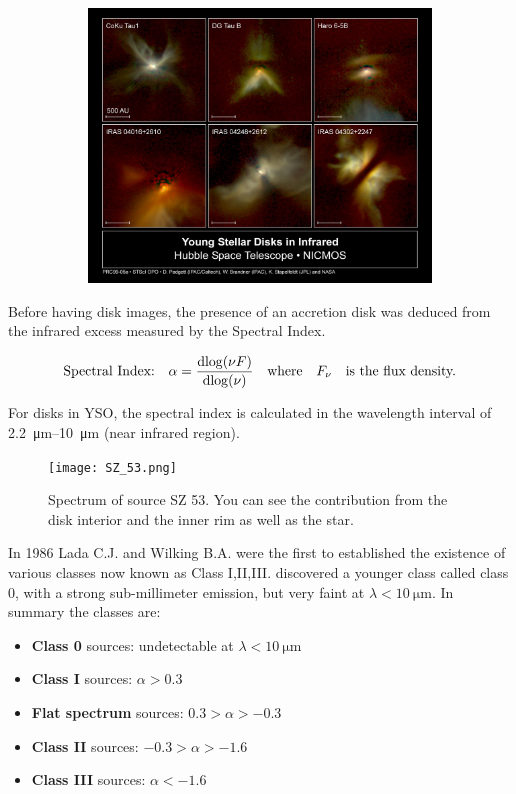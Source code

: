 \documentclass[10pt,a4paper,english]{article}
\begin{document}
\begin{figure}[!ht]
\begin{subfigure}[t]{0.595\textwidth}
    \includegraphics[width=\textwidth]{YSO_IR.jpg}
  \end{subfigure}
\end{figure}

Before having disk images, the presence of an accretion disk was deduced from
the infrared excess measured by the Spectral Index.

\[
    \text{Spectral Index:}\quad \alpha=\frac{\mathrm{d}{\log(\nu F)}}{\mathrm{d}{
    \log(\nu)}}\quad\text{where}\quad F_{\nu}\quad\text{is the flux density.}
\]


For disks in YSO, the spectral index is calculated in the wavelength interval
of \SIrange{2.2}{10}{\um} (near infrared region).

\begin{figure}[!ht]
  \centering
  \texttt{[image: SZ\_53.png]}
  \caption{\label{fig:SZ_53} Spectrum of source SZ 53. You can see the contribution from the disk interior and the inner rim as well as the star.}
\end{figure}

In 1986 Lada C.J. and Wilking B.A. were the first to established the existence
of various classes now known as Class I,II,III. \cite{1993ApJ...406..122A}
discovered a younger class called class 0, with a strong sub-millimeter
emission, but very faint at $\lambda<\SI{10}{\um}$. In summary the classes are:
\begin{itemize}
    \item \textbf{Class 0} sources: undetectable at $\lambda<\SI{10}{\um}$
    \item \textbf{Class I} sources: $\alpha>0.3$
    \item \textbf{Flat spectrum} sources: $0.3>\alpha>-0.3$
    \item \textbf{Class II} sources: $-0.3>\alpha>-1.6$
    \item \textbf{Class III} sources: $\alpha<-1.6$
\end{itemize}
\end{document}
